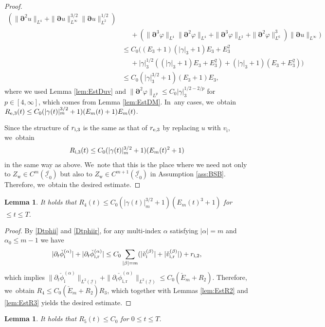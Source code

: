 \documentclass[10pt]{amsart}
\newcommand{\dt}{\partial_t}
\newcommand{\cI}{{\mathcal I}}
\newcommand{\ul}[1]{\underline{#1}}
\newtheorem{lemma}[theorem]{Lemma}
\theoremstyle{definition}
\begin{document}
\begin{proof}
\begin{align*}
(\|\bm{\partial}^2u\|_{L^4} + \|\bm{\partial}u\|_{L^\infty}^{3/2}\|\bm{\partial}u\|_{L^2}^{1/2}) \\
&\quad\;
+ (\|\bm{\partial}^3\varphi\|_{L^4}\|\bm{\partial}^2\varphi\|_{L^4} + \|\bm{\partial}^3\varphi\|_{L^2} + \|\bm{\partial}^2\varphi\|_{L^6}^3)
\|\bm{\partial}u\|_{L^\infty} \Bigr) \\
&\leq C_0 \bigl((E_3+1)(|\gamma|_3+1)E_3 + E_3^2 \\
&\quad\;
+ |\gamma|_3^{1/2}((|\gamma|_3+1)E_3 + E_3^2) + (|\gamma|_3+1)(E_3 + E_3^2) \bigr) \\
&\leq C_0(|\gamma|_3^{3/2}+1)(E_3+1)E_3,
\end{align*}
where we used Lemma \ref{lem:EstDuv} and $\|\bm{\partial}^2\varphi\|_{L^p} \leq C_0|\gamma|_3^{1/2-2/p}$ for $p\in[4,\infty]$,
which comes from Lemma \ref{lem:EstDM}. In~any cases, we~obtain $R_{{\rm e},3}(t) \leq C_0(|\gamma(t)|_m^{3/2}+1)(E_m(t)+1)E_m(t)$.

Since the structure of $r_{{\rm i},3}$ is the same as that of $r_{{\rm e},3}$ by replacing $u$ with $v_\mathrm{i}$, we~obtain
\[
R_{{\rm i},3}(t) \leq C_0(|\gamma(t)|_m^{3/2}+1)(E_m(t)^2+1)
\]
in the same way as above. We~note that this is the place where we need not only to $Z_\mathrm{w}\in C^m(\overline{\ul{\cI}_0})$
but also to $Z_\mathrm{w}\in C^{m+1}(\overline{\ul{\cI}_0})$ in Assumption \ref{ass:BSB}.
Therefore, we~obtain the desired estimate.
\end{proof}

\begin{lemma}\label{lem:EstR4}
It holds that $R_4(t) \leq C_0(|\gamma(t)|_m^{3/2}+1)(E_m(t)^3+1)$ for $\leq t\leq T$.
\end{lemma}

\begin{proof}
By \eqref{Dtphii} and \eqref{Dtphiir}, for any multi-index $\alpha$ satisfying $|\alpha|=m$ and $\alpha_0\leq m-1$ we have
\[
|\dt\check{\phi}_\mathrm{i}^{(\alpha)}| + |\dt\check{\phi}_\mathrm{i,r}^{(\alpha)}|
\leq C_0\sum_{|\beta|=m} (|\check{v}_\mathrm{i}^{(\beta)}| + |\check{v}_\mathrm{i,r}^{(\beta)}|) + r_{{\rm i},2},
\]
which implies
$\|\dt\check{\phi}_\mathrm{i}^{(\alpha)}\|_{L^2(\ul{\cI})} + \|\dt\check{\phi}_\mathrm{i,r}^{(\alpha)}\|_{L^2(\ul{\cI})}\leq C_0(\check{E}_m + R_2)$.
Therefore, we~obtain $R_4 \leq C_0 (\check{E}_m + R_2)R_3$, which together with Lemmas \ref{lem:EstR2} and \ref{lem:EstR3} yields the desired estimate.
\end{proof}

\begin{lemma}\label{lem:EstR5}
It holds that $R_5(t) \leq C_0$ for $0\leq t\leq T$.
\end{lemma}
\end{document}
